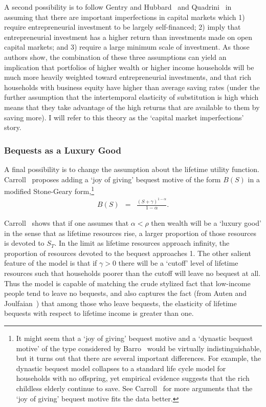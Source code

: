 \documentclass[12pt]{article}
\begin{document}
A second possibility is to follow Gentry and Hubbard~\cite
{gentry&hubbard:wealthysave} and Quadrini~\cite{quadrini:entrepreneurship}
in assuming that there are important imperfections in capital markets which
1) require entrepreneurial investment to be largely self-financed; 2) imply
that entrepreneurial investment has a higher return than investments made on
open capital markets; and 3) require a large minimum scale of investment. As
those authors show, the combination of these three assumptions can yield an
implication that portfolios of higher wealth or higher income households
will be much more heavily weighted toward entrepreneurial investments, and
that rich households with business equity have higher than average saving
rates (under the further assumption that the intertemporal elasticity of
substitution is high which means that they take advantage of the high
returns that are available to them by saving more). I will refer to this
theory as the `capital market imperfections' story.

\subsubsection{Bequests as a Luxury Good}

A final possibility is to change the assumption about the lifetime utility
function. Carroll~\cite{carroll:richsave} proposes adding a `joy of giving'
bequest motive of the form $B(S)$ in a modified Stone-Geary form,\footnote{%
It might seem that a `joy of giving' bequest motive and a `dynastic bequest
motive' of the type considered by Barro~\cite{barro:bondsnetworth} would be
virtually indistinguishable, but it turns out that there are several
important differences. For example, the dynastic bequest model collapses to
a standard life cycle model for households with no offspring, yet empirical
evidence suggests that the rich childless elderly continue to save. See
Carroll~\cite{carroll:richsave} for more arguments that the `joy of giving'
bequest motive fits the data better.} 
\begin{eqnarray*}
B(S) &= &\frac{(S + \gamma)^{1-\alpha}}{1-\alpha}.
\end{eqnarray*}

Carroll~\cite{carroll:richsave} shows that if one assumes that $\alpha<\rho$
then wealth will be a `luxury good' in the sense that as lifetime resources
rise, a larger proportion of those resources is devoted to $S_{T}$. In the
limit as lifetime resources approach infinity, the proportion of resources
devoted to the bequest approaches 1. The other salient feature of the model
is that if $\gamma > 0$ there will be a `cutoff' level of lifetime resources
such that households poorer than the cutoff will leave no bequest at all.
Thus the model is capable of matching the crude stylized fact that
low-income people tend to leave no bequests, and also captures the fact
(from Auten and Joulfaian~\cite{auten&joulfaian:charitable}) that among
those who leave bequests, the elasticity of lifetime bequests with respect
to lifetime income is greater than one.
\end{document}
